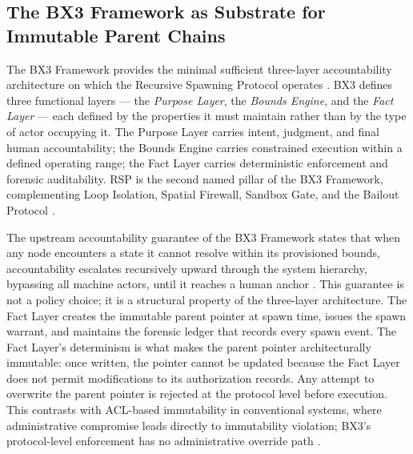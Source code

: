 \subsection{The BX3 Framework as Substrate for Immutable Parent Chains}

The BX3 Framework provides the minimal sufficient three-layer accountability architecture on which the Recursive Spawning Protocol operates \cite{bx3framework,bx3framework2026}. BX3 defines three functional layers — the \textit{Purpose Layer}, the \textit{Bounds Engine}, and the \textit{Fact Layer} — each defined by the properties it must maintain rather than by the type of actor occupying it. The Purpose Layer carries intent, judgment, and final human accountability; the Bounds Engine carries constrained execution within a defined operating range; the Fact Layer carries deterministic enforcement and forensic auditability. RSP is the second named pillar of the BX3 Framework, complementing Loop Isolation, Spatial Firewall, Sandbox Gate, and the Bailout Protocol \cite{bx3framework,bailoutprotocol2026}.

The upstream accountability guarantee of the BX3 Framework states that when any node encounters a state it cannot resolve within its provisioned bounds, accountability escalates recursively upward through the system hierarchy, bypassing all machine actors, until it reaches a human anchor \cite{bx3framework,bx3framework2026}. This guarantee is not a policy choice; it is a structural property of the three-layer architecture. The Fact Layer creates the immutable parent pointer at spawn time, issues the spawn warrant, and maintains the forensic ledger that records every spawn event. The Fact Layer's determinism is what makes the parent pointer architecturally immutable: once written, the pointer cannot be updated because the Fact Layer does not permit modifications to its authorization records. Any attempt to overwrite the parent pointer is rejected at the protocol level before execution. This contrasts with ACL-based immutability in conventional systems, where administrative compromise leads directly to immutability violation; BX3's protocol-level enforcement has no administrative override path \cite{bx3framework,bansal2019}.

